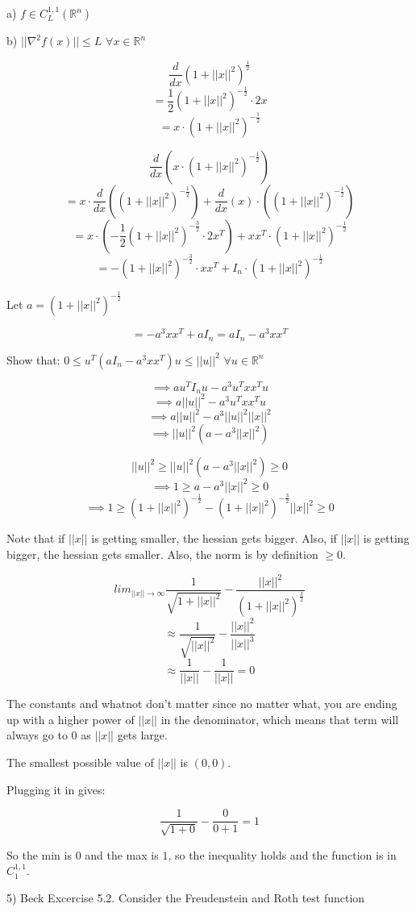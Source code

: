 \documentclass{article}
\newcommand{\RR}{\mathbb{R}}
\begin{document}
a) $f \in C_L^{1,1}(\RR^n)$

b) $||\nabla^2 f(x)|| \leq L$ $\forall x \in \RR^n$


\[\frac{d}{dx} (1 + ||x||^2)^{\frac{1}{2}}\]
\[= \frac{1}{2}(1+||x||^2)^{-\frac{1}{2}} \cdot 2x\]
\[= x \cdot (1 + ||x||^2)^{-\frac{1}{2}}\]

\[\frac{d}{dx} (x \cdot (1 + ||x||^2)^{-\frac{1}{2}})\]
\[= x \cdot \frac{d}{dx}((1 + ||x||^2)^{-\frac{1}{2}}) + \frac{d}{dx}(x) \cdot ((1 + ||x||^2)^{-\frac{1}{2}})\]
\[= x \cdot (-\frac{1}{2}(1 + ||x||^2)^{-\frac{3}{2}} \cdot 2x^T) + xx^T \cdot (1 + ||x||^2)^{-\frac{1}{2}}\]
\[= -(1 + ||x||^2)^{-\frac{3}{2}} \cdot xx^T + I_n \cdot (1 + ||x||^2)^{-\frac{1}{2}}\]

Let $a = (1 + ||x||^2)^{-\frac{1}{2}}$

\[= -a^3 xx^T + aI_n = aI_n - a^3xx^T\]


Show that: $0 \leq u^T (aI_n - a^3xx^T) u \leq ||u||^2$ $\forall u \in \RR^n$

\[\implies a u^T I_n u - a^3 u^T xx^T u\]
\[\implies a||u||^2 - a^3 u^T xx^T u\]
\[\implies a||u||^2 - a^3 ||u||^2 ||x||^2\]
\[\implies ||u||^2 (a - a^3 ||x||^2)\]

\[||u||^2 \geq ||u||^2 (a - a^3 ||x||^2) \geq 0\]
\[\implies 1 \geq a - a^3 ||x||^2 \geq 0\]
\[\implies 1 \geq (1 + ||x||^2)^{-\frac{1}{2}} - (1 + ||x||^2)^{-\frac{3}{2}} ||x||^2 \geq 0\]

Note that if $||x||$ is getting smaller, the hessian gets bigger.
Also, if $||x||$ is getting bigger, the hessian gets smaller.
Also, the norm is by definition $\geq 0$.


\[lim_{||x|| \to \infty} \frac{1}{\sqrt{1+||x||^2}} - \frac{||x||^2}{(1 + ||x||^2)^{\frac{3}{2}}}\]
\[\approx \frac{1}{\sqrt{||x||^2}} - \frac{||x||^2}{||x||^3}\]
\[\approx \frac{1}{||x||} - \frac{1}{||x||} = 0\]

The constants and whatnot don't matter since no matter what, you are ending up with
a higher power of $||x||$ in the denominator, which means
that term will always go to $0$ as $||x||$ gets large.


The smallest possible value of $||x||$ is $(0, 0)$.

Plugging it in gives:

\[\frac{1}{\sqrt{1 + 0}} - \frac{0}{0 + 1} = 1\]

So the min is $0$ and the max is $1$,
so the inequality holds and the function is in $C_1^{1,1}$.


5) Beck Excercise 5.2. Consider the Freudenstein and Roth test function
\end{document}
